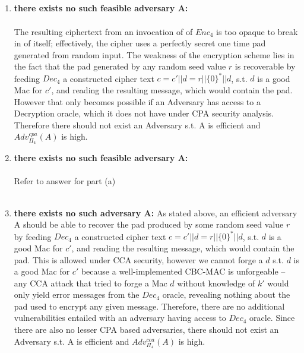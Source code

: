 \documentclass[]{article}
\begin{document}
\subsection{}
\begin{enumerate}[label=(\alph*)]
	\item \textbf{there exists no such feasible adversary A:}
	\\\\
	The resulting ciphertext from an invocation of of $Enc_4$ is too opaque to break in of itself; effectively, the cipher uses a perfectly secret one time pad generated from random input. The weakness of the encryption scheme lies in the fact that the pad generated by any random seed value $r$ is recoverable by feeding $Dec_4$ a constructed cipher text $c = c' || d = r || \{0\}^* || d$, s.t. $d$ is a good Mac for $c'$, and reading the resulting message, which would contain the pad. However that only becomes possible if an Adversary has access to a Decryption oracle, which it does not have under CPA security analysis. Therefore there should not exist an Adversary s.t. A is efficient and $Adv_{\Pi_4}^{cpa}(A)$ is high.
	\item \textbf{there exists no such feasible adversary A:}
	\\\\
	Refer to answer for part (a)
	\\\\
	\item \textbf{there exists no such adversary A:}
	As stated above, an efficient adversary A should be able to recover the pad produced by some random seed value $r$ by feeding $Dec_4$ a constructed cipher text $c = c' || d = r || \{0\}^* || d$, s.t. $d$ is a good Mac for $c'$, and reading the resulting message, which would contain the pad. This is allowed under CCA security, however we cannot forge a $d$ s.t. $d$ is a good Mac for $c'$ because a well-implemented CBC-MAC is unforgeable -- any CCA attack that tried to forge a Mac $d$ without knowledge of $k'$ would only yield error messages from the $Dec_4$ oracle, revealing nothing about the pad used to encrypt any given message. Therefore, there are no additional vulnerabilities entailed with an adversary having access to $Dec_4$ oracle. Since there are also no lesser CPA based adversaries, there should not exist an Adversary s.t. A is efficient and $Adv_{\Pi_4}^{cca}(A)$ is high.
\end{enumerate}
\end{document}
